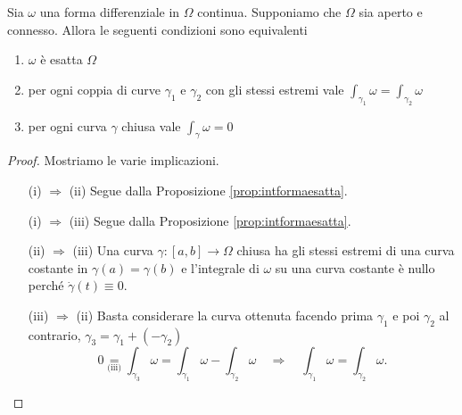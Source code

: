 \begin{thm} \label{thm:carattesattezza}
	Sia $ \omega $ una forma differenziale in $ \Omega $ continua. Supponiamo che $ \Omega $ sia aperto e connesso. Allora le seguenti condizioni sono equivalenti
	\begin{enumerate}[label = (\roman*)]
		\item $ \omega $ è esatta $ \Omega $
		\item per ogni coppia di curve $ \gamma_1 $ e $ \gamma_2 $ con gli stessi estremi vale $ \int_{\gamma_1} \omega = \int_{\gamma_2} \omega $
		\item per ogni curva $ \gamma $ chiusa vale $ \int_{\gamma} \omega = 0 $
	\end{enumerate}
\end{thm}
%
\begin{proof}
	Mostriamo le varie implicazioni.
	\begin{enumerate}
		\item[(i) $ \Rightarrow $ (ii)] Segue dalla Proposizione \ref{prop:intformaesatta}.

		\item[(i) $ \Rightarrow $ (iii)] Segue dalla Proposizione \ref{prop:intformaesatta}.

		\item[(ii) $ \Rightarrow $ (iii)] Una curva $ \gamma \colon [a, b] \to \Omega $ chiusa ha gli stessi estremi di una curva costante in $ \gamma(a) = \gamma(b) $ e l'integrale di $ \omega $ su una curva costante è nullo perché $ \dot{\gamma}(t) \equiv 0 $.

		\item[(iii) $ \Rightarrow $ (ii)] Basta considerare la curva ottenuta facendo prima $ \gamma_1 $ e poi $ \gamma_2 $ al contrario, $ \gamma_3 = \gamma_1 + (-\gamma_2) $
		\[
			0 \underset{\text{(iii)}}{=} \int_{\gamma_3} \omega = \int_{\gamma_1} \omega - \int_{\gamma_2} \omega \quad \Rightarrow \quad \int_{\gamma_1} \omega = \int_{\gamma_2} \omega.
		\]


\end{enumerate}
\end{proof}

